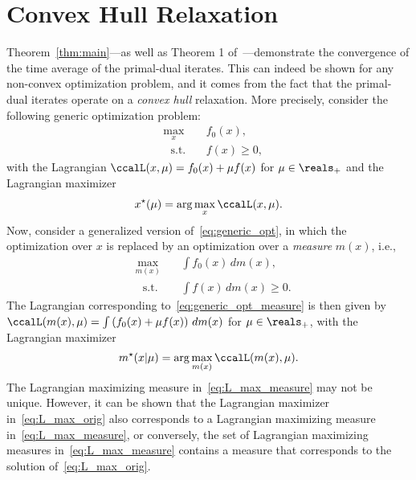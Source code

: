 \section{Convex Hull Relaxation}\label{appx:convex_hull}
Theorem~\ref{thm:main}---as well as Theorem 1 of~\cite{calvo2021state}---demonstrate the convergence of the time average of the primal-dual iterates. This can indeed be shown for any non-convex optimization problem, and it comes from the fact that the primal-dual iterates operate on a \emph{convex hull} relaxation. More precisely, consider the following generic optimization problem:
\begin{subequations}\label{eq:generic_opt}
\begin{alignat}{2}
    &\max_{x} &~& f_0(x),           \\
    &~~~\text{s.t.} &&  f(x) \geq 0,%
\end{alignat}
\end{subequations}
with the Lagrangian $\ccalL(x,\mu) = f_0(x) + \mu f(x)$ for $\mu \in \reals_+$ and the Lagrangian maximizer
\begin{align}\label{eq:L_max_orig}
x^{\star}(\mu) = \arg \max_x \ccalL(x,\mu).
\end{align}
Now, consider a generalized version of~\eqref{eq:generic_opt}, in which the optimization over $x$ is replaced by an optimization over a \emph{measure} $m(x)$, i.e.,
\begin{subequations}\label{eq:generic_opt_measure}
\begin{alignat}{2}
    &\max_{m(x)} &~& \int f_0(x) \, dm(x),           \\
    &~~~\text{s.t.} &&  \int f(x) \, dm(x) \geq 0.%
\end{alignat}
\end{subequations}
The Lagrangian corresponding to~\eqref{eq:generic_opt_measure} is then given by $\ccalL(m(x),\mu) = \int \left(f_0(x) + \mu f(x) \right)  \, dm(x)$ for $\mu \in \reals_+$, with the Lagrangian maximizer
\begin{align}\label{eq:L_max_measure}
m^{\star}(x|\mu) = \arg \max_{m(x)} \ccalL(m(x),\mu).
\end{align}
The Lagrangian maximizing measure in~\eqref{eq:L_max_measure} may not be unique. However, it can be shown that the Lagrangian maximizer in~\eqref{eq:L_max_orig} also corresponds to a Lagrangian maximizing measure in~\eqref{eq:L_max_measure}, or conversely, the set of Lagrangian maximizing measures in~\eqref{eq:L_max_measure} contains a measure that corresponds to the solution of~\eqref{eq:L_max_orig}.


